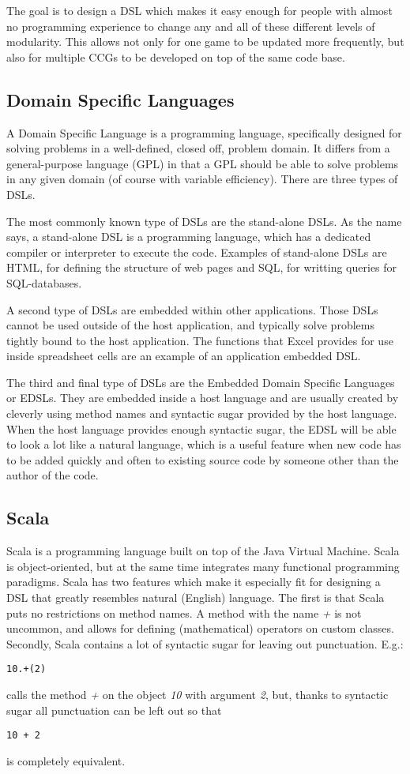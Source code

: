 \documentclass[twocolumn]{phdsymp}
\begin{document}
The goal is to design a DSL which makes it easy enough for people with almost no programming experience to change any and all of these different levels of modularity. This allows not only for one game to be updated more frequently, but also for multiple CCGs to be developed on top of the same code base.
\subsection{Domain Specific Languages}
\label{DSLs}
A Domain Specific Language is a programming language, specifically designed for solving problems in a well-defined, closed off, problem domain. It differs from a general-purpose language (GPL) in that a GPL should be able to solve problems in any given domain (of course with variable efficiency). There are three types of DSLs.

The most commonly known type of DSLs are the stand-alone DSLs. As the name says, a stand-alone DSL is a programming language, which has a dedicated compiler or interpreter to execute the code. Examples of stand-alone DSLs are HTML, for defining the structure of web pages and SQL, for writting queries for SQL-databases.

A second type of DSLs are embedded within other applications. Those DSLs cannot be used outside of the host application, and typically solve problems tightly bound to the host application. The functions that Excel provides for use inside spreadsheet cells are an example of an application embedded DSL.

The third and final type of DSLs are the Embedded Domain Specific Languages or EDSLs. They are embedded inside a host language and are usually created by cleverly using method names and syntactic sugar provided by the host language. When the host language provides enough syntactic sugar, the EDSL will be able to look a lot like a natural language, which is a useful feature when new code has to be added quickly and often to existing source code by someone other than the author of the code.
\subsection{Scala}
\label{Scala}
Scala is a programming language built on top of the Java Virtual Machine. Scala is object-oriented, but at the same time integrates many functional programming paradigms. Scala has two features which make it especially fit for designing a DSL that greatly resembles natural (English) language. The first is that Scala puts no restrictions on method names. A method with the name \textit{+} is not uncommon, and allows for defining (mathematical) operators on custom classes. Secondly, Scala contains a lot of syntactic sugar for leaving out punctuation. E.g.:
\begin{verbatim}
10.+(2)
\end{verbatim}
calls the method \textit{+} on the object \textit{10} with argument \textit{2}, but, thanks to syntactic sugar all punctuation can be left out so that
\begin{verbatim}
10 + 2
\end{verbatim}
is completely equivalent.
\end{document}
